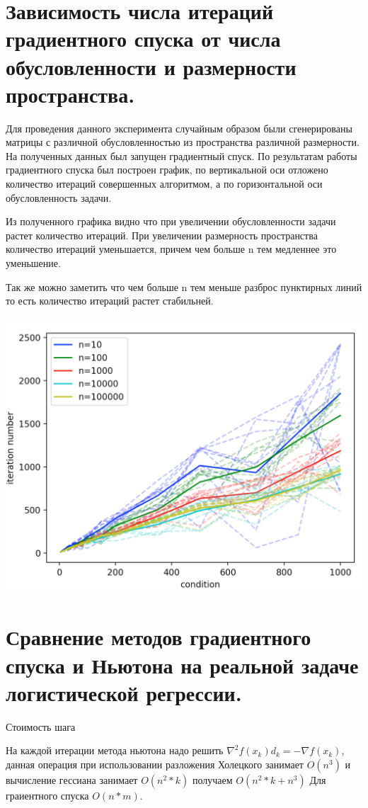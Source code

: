 \documentclass{article}
\theoremstyle{definition}
\theoremstyle{remark}
\begin{document}
\section{Зависимость числа итераций градиентного спуска от числа обусловленности и размерности пространства.}

Для проведения данного эксперимента случайным образом были сгенерированы матрицы с различной обусловленностью из пространства различной размерности.
На полученных данных был запущен градиентный спуск.
По результатам работы градиентного спуска был построен график, по вертикальной оси отложено количество итераций совершенных алгоритмом, а по горизонтальной оси обусловленность задачи.

Из полученного графика видно что при увеличении обусловленности задачи растет количество итераций. При увеличении размерность пространства количество итераций уменьшается, причем чем больше n тем медленнее это уменьшение.

Так же можно заметить что чем больше n тем меньше разброс пунктирных линий то есть количество итераций растет стабильней.

\includegraphics[width=1 \textwidth]{21.png}


\section{Сравнение методов градиентного спуска и Ньютона на реальной задаче логистической регрессии.}


Стоимость шага


На каждой итерации метода ньютона надо решить $\nabla^2 f(x_k)d_k = - \nabla f(x_k)$, данная операция при использовании разложения Холецкого занимает $O(n^3)$ и вычисление гессиана занимает $O(n^2*k)$ получаем $O(n^2*k + n^3)$
Для граиентного спуска $O(n * m)$.
\end{document}
